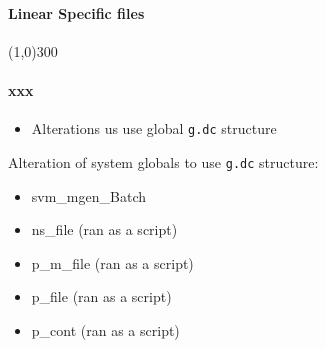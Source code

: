 \documentclass[12pt]{article}
\begin{document}
	\begin{comment}
	Files that were altered:
	dc_cont
	dc_cur
	dc_indx
	dc_lf
	dc_line
	dc_load
	dc_sim
	dc_vidc
	handleNewGlobals
	inv_lf
	i_simu
	lfdcs
	nc_load
	rec_lf
	red_ybus
	s_simu_Batch
	\end{comment}

\pagebreak
\paragraph{Linear Specific files}\line(1,0){300}

\paragraph{xxx}
	\begin{itemize}
		\item Alterations us use global \verb|g.dc| structure
	\end{itemize}
	
Alteration of system globals to use \verb|g.dc| structure:

	\begin{itemize}
		\item svm\_mgen\_Batch
		\item ns\_file (ran as a script)
		\item p\_m\_file (ran as a script)
		\item p\_file (ran as a script)
		\item p\_cont (ran as a script)
	\end{itemize}
	
	
\end{document}
